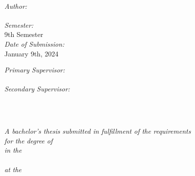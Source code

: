 \documentclass[
11pt, %
english, %
singlespacing, %
headsepline, %
]{MastersDoctoralThesis} %
\author{Jason Rietzke} %
\begin{document}
\frontmatter %

\pagestyle{plain} %


\begin{titlepage}
	\begin{center}
		{\huge \bfseries \ttitle\par}\vspace{0.4cm}
		\HRule \\[1.5cm]

		\begin{minipage}[t]{0.4\textwidth}
		\begin{flushleft} \large
		\emph{Author:}\\
		\authorname\\[0.3cm]
		\emph{Semester:}\\
		{9th Semester}\\[0.3cm]
		\emph{Date of Submission:}\\
		{January 9th, 2024}\\[0.3cm]

		\end{flushleft}
		\end{minipage}
		\begin{minipage}[t]{0.5\textwidth}
		\begin{flushright} \large
		\emph{Primary Supervisor:} \\
		\psupname\\[0.3cm]
		\emph{Secondary Supervisor:} \\
		\ssupname\\
		\end{flushright}
		\end{minipage}\\[3cm]
		
		\vfill

		\large\textit{
			A bachelor's thesis submitted in fulfillment of the requirements\\ for the degree of \degreename
		}\\[0.3cm]
		\large\textit{in the}\\[0.4cm]
		\large\textit\deptname\\[0.4cm]
		\large\textit{at the}\\[0.4cm]
		\large\textit\univname\\[2cm]

		\vfill
	\end{center}
\end{titlepage}
\end{document}
